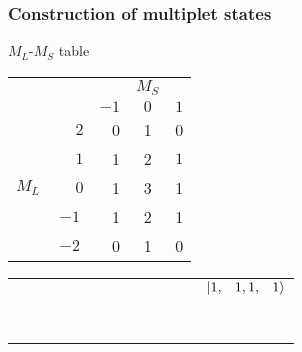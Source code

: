 \begin{frame}[t]
  \frametitle{Construction of multiplet states}
  \footnotesize
  $M_L$-$M_S$ table
  \begin{center}
  \begin{tabular}{c c|r c c}
        &  &  & $M_S$ & \\
        &  & $-1$ & $0$ & $1$ \\ \hline
        & $\phantom{-}2$ & 0 & 1 & 0 \\
        & $\phantom{-}1$ & 1 & 2 & $\boxed{1}$ \\
  $M_L$ & $\phantom{-}0$ & 1 & 3 & 1 \\
        & $-1$ & 1 & 2 & 1 \\
        & $-2$ & 0 & 1 & 0 \\
  \end{tabular}
  \end{center}
  
  \vspace{-0.5em}
  \begin{center}
  \begin{tabular}{r r r}
  $\phantom{\Ket{1,\phantom{-}1,1,-1}}$ & $\phantom{\Ket{1,\phantom{-}1,1,\phantom{-}0}}$ & $\Ket{1,\phantom{-}1,1,\phantom{-}1}$ \\
  $\phantom{\Ket{1,\phantom{-}0,1,-1}}$ & $\phantom{\Ket{1,\phantom{-}0,1,\phantom{-}0}}$ & $\phantom{\Ket{1,\phantom{-}0,1,\phantom{-}1}}$ \\
  $\phantom{\Ket{1,-1,1,-1}}$ & $\phantom{\Ket{1,-1,1,\phantom{-}0}}$ & $\phantom{\Ket{1,-1,1,\phantom{-}1}}$ \\
  \end{tabular}
  \end{center}
\end{frame}

